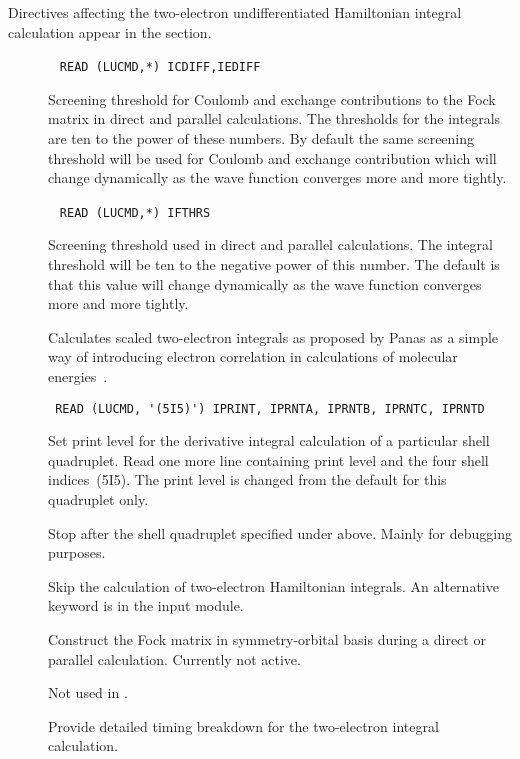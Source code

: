 Directives affecting the two-electron
undifferentiated Hamiltonian
integral calculation appear in the  section.
\begin{description}
\item[]\verb| |\newline
\verb|READ (LUCMD,*) ICDIFF,IEDIFF|

Screening threshold for Coulomb and exchange
contributions to the Fock
matrix in direct and parallel calculations. The thresholds for the
integrals are ten to the power of these numbers. By default the same
screening threshold will be used for Coulomb and exchange
contribution which will change dynamically as the wave function
converges more and more tightly.

\item[]\verb| |\newline
\verb|READ (LUCMD,*) IFTHRS|

Screening threshold used in direct and
parallel calculations. The integral threshold will be ten to the
negative power of this number. The default is that this value will change dynamically as the wave function converges more and more tightly.

\item[] Calculates scaled two-electron integrals as
proposed by Panas as a simple way of introducing electron
correlation in calculations of molecular energies~\cite{ipcpl245}.

\item[]\verb| |\newline
\verb|READ (LUCMD, '(5I5)') IPRINT, IPRNTA, IPRNTB, IPRNTC, IPRNTD|

Set print level for the derivative integral calculation of a particular shell
quadruplet.  Read one more line containing print level and the four
shell indices~(5I5).  The print level is changed from the default
for this quadruplet only.

\item[] Stop after the shell quadruplet specified
under  above. Mainly for debugging purposes.

\item[] Skip the calculation of two-electron Hamiltonian
integrals. An alternative keyword is  in the 
input module.

\item[] Construct the Fock matrix in symmetry-orbital
basis during a direct or parallel calculation. Currently not active.

\item[] Not used in \siraba .

\item[] Provide detailed timing breakdown for the
two-electron integral calculation.
\end{description}


